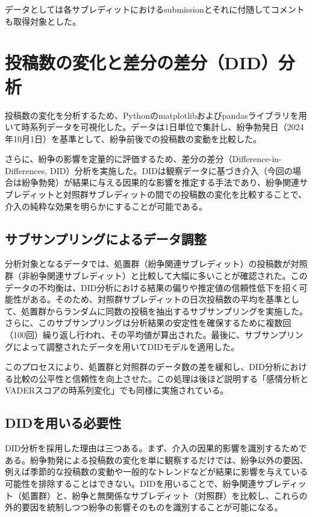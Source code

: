 \documentclass[11pt, a4j]{jreport}
\begin{document}
    データとしては各サブレディットにおけるsubmissionとそれに付随してコメントも取得対象とした。

    \section{投稿数の変化と差分の差分（DID）分析}
    投稿数の変化を分析するため、Pythonのmatplotlibおよびpandasライブラリを用いて時系列データを可視化した。データは1日単位で集計し、紛争勃発日（2024年10月1日）を基準として、紛争前後での投稿数の変動を比較した。

    さらに、紛争の影響を定量的に評価するため、差分の差分（Difference-in-Differences, DID）分析を実施した。DIDは観察データに基づき介入（今回の場合は紛争勃発）が結果に与える因果的な影響を推定する手法であり、紛争関連サブレディットと対照群サブレディットの間での投稿数の変化を比較することで、介入の純粋な効果を明らかにすることが可能である。

    \subsection{サブサンプリングによるデータ調整}
    分析対象となるデータでは、処置群（紛争関連サブレディット）の投稿数が対照群（非紛争関連サブレディット）と比較して大幅に多いことが確認された。このデータの不均衡は、DID分析における結果の偏りや推定値の信頼性低下を招く可能性がある。そのため、対照群サブレディットの日次投稿数の平均を基準として、処置群からランダムに同数の投稿を抽出するサブサンプリングを実施した。さらに、このサブサンプリングは分析結果の安定性を確保するために複数回（100回）繰り返し行われ、その平均値が算出された。最後に、サブサンプリングによって調整されたデータを用いてDIDモデルを適用した。

    このプロセスにより、処置群と対照群のデータ数の差を緩和し、DID分析における比較の公平性と信頼性を向上させた。この処理は後ほど説明する「感情分析とVADERスコアの時系列変化」でも同様に実施されている。

    \subsection{DIDを用いる必要性}
    DID分析を採用した理由は三つある。まず、介入の因果的影響を識別するためである。紛争勃発による投稿数の変化を単に観察するだけでは、紛争以外の要因、例えば季節的な投稿数の変動や一般的なトレンドなどが結果に影響を与えている可能性を排除することはできない。DIDを用いることで、紛争関連サブレディット（処置群）と、紛争と無関係なサブレディット（対照群）を比較し、これらの外的要因を統制しつつ紛争の影響そのものを識別することが可能になる。
    
\end{document}
